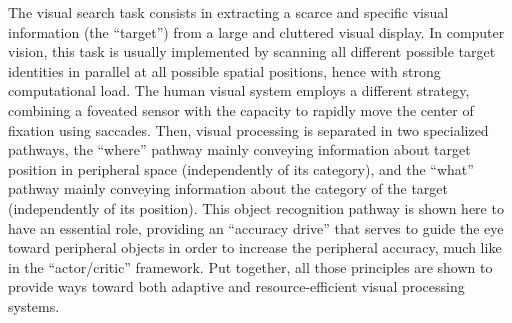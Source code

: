 \documentclass[10pt,a4paper]{article}
\begin{document}
The visual search task consists in extracting a scarce and specific visual information (the ``target'') from a large and cluttered visual display. In computer vision, this task is usually implemented by scanning all different possible target identities in parallel at all possible spatial positions, hence with strong computational load. The human visual system employs a different strategy, combining a foveated sensor with the capacity to rapidly move the center of fixation using saccades. Then, visual processing is separated in two specialized pathways, the ``where'' pathway mainly conveying information about target position in peripheral space (independently of its category), and the ``what'' pathway mainly conveying information about the category of the target (independently of its position). This object recognition pathway is shown here to have an essential role, providing an ``accuracy drive'' that serves to guide the eye toward peripheral objects in order to increase the peripheral accuracy, much like in the ``actor/critic'' framework. Put together, all those principles are shown to provide ways toward both adaptive and resource-efficient visual processing systems.









\nolinenumbers



\end{document}

